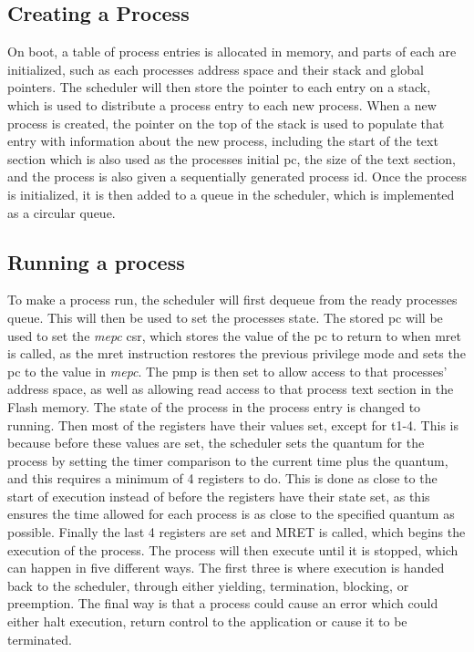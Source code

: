 \subsection{Creating a Process}
On boot, a table of process entries is allocated in memory, and parts of each are initialized, such as each processes address space and their stack and global pointers. The scheduler will then store the pointer to each entry on a stack, which is used to distribute a process entry to each new process. When a new process is created, the pointer on the top of the stack is used to populate that entry with information about the new process, including the start of the text section which is also used as the processes initial pc, the size of the text section, and the process is also given a sequentially generated process id. Once the process is initialized, it is then added to a queue in the scheduler, which is implemented as a circular queue.
\subsection{Running a process}
To make a process run, the scheduler will first dequeue from the ready processes queue. This will then be used to set the processes state. The stored pc will be used to set the \textit{mepc} csr, which stores the value of the pc to return to when mret is called, as the mret instruction restores the previous privilege mode and sets the pc to the value in \textit{mepc}. The \ac{pmp} is then set to allow access to that processes' address space, as well as allowing read access to that process text section in the Flash memory. The state of the process in the process entry is changed to running. Then most of the registers have their values set, except for t1-4. This is because before these values are set, the scheduler sets the quantum for the process by setting the timer comparison to the current time plus the quantum, and this requires a minimum of 4 registers to do. This is done as close to the start of execution instead of before the registers have their state set, as this ensures the time allowed for each process is as close to the specified quantum as possible. Finally the last 4 registers are set and MRET is called, which begins the execution of the process. The process will then execute until it is stopped, which can happen in five different ways. The first three is where execution is handed back to the scheduler, through either yielding, termination, blocking, or preemption. The final way is that a process could cause an error which could either halt execution, return control to the application or cause it to be terminated.
